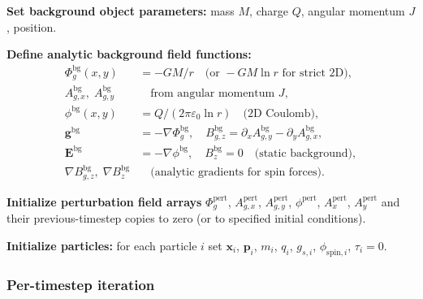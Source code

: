 \documentclass[11pt,a4paper]{article}
\newcommand{\vv}[1]{\mathbf{#1}}
\newcommand{\Phig}{\Phi_g}
\begin{document}
\begin{algsteps}
  \item \textbf{Set background object parameters:} mass $M$, charge $Q$, angular momentum $J$, position.

  \item \textbf{Define analytic background field functions:}
  \begin{align}
    \Phig^{\mathrm{bg}}(x,y) &= -GM/r \quad\text{(or }-GM\ln r\text{ for strict 2D)}, \\
    A_{g,x}^{\mathrm{bg}},\; A_{g,y}^{\mathrm{bg}} &\quad\text{from angular momentum }J, \\
    \phi^{\mathrm{bg}}(x,y)  &= Q/(2\pi\varepsilon_0\ln r) \quad\text{(2D Coulomb)}, \\
    \vv{g}^{\mathrm{bg}}     &= -\nabla\Phig^{\mathrm{bg}}, \quad
    B_{g,z}^{\mathrm{bg}}  = \partial_x A_{g,y}^{\mathrm{bg}} - \partial_y A_{g,x}^{\mathrm{bg}}, \\
    \vv{E}^{\mathrm{bg}}     &= -\nabla\phi^{\mathrm{bg}}, \quad
    B_z^{\mathrm{bg}} = 0 \quad\text{(static background)}, \\
    \nabla B_{g,z}^{\mathrm{bg}},\; \nabla B_z^{\mathrm{bg}} &\quad\text{(analytic gradients for spin forces).}
  \end{align}

  \item \textbf{Initialize perturbation field arrays} $\Phig^{\mathrm{pert}}$, $A_{g,x}^{\mathrm{pert}}$, $A_{g,y}^{\mathrm{pert}}$, $\phi^{\mathrm{pert}}$, $A_x^{\mathrm{pert}}$, $A_y^{\mathrm{pert}}$ and their previous-timestep copies to zero (or to specified initial conditions).

  \item \textbf{Initialize particles:} for each particle $i$ set $\vv{x}_i$, $\vv{p}_i$, $m_i$, $q_i$, $g_{s,i}$, $\phi_{\mathrm{spin},i}$, $\tau_i = 0$.
\end{algsteps}

\subsubsection*{Per-timestep iteration}
\end{document}
